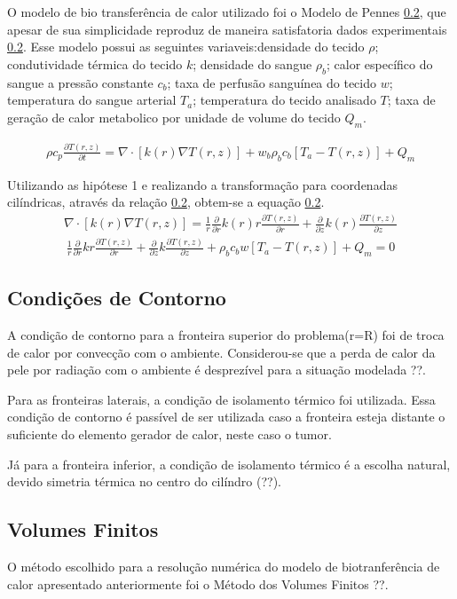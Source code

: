\documentclass[
	12pt,				%
	openright,			%
	oneside,			%
	a4paper,			%
	english,			%
	french,				%
	spanish,			%
	brazil				%
	]{abntex2}
\begin{document}
O modelo de bio transferência de calor utilizado foi o Modelo de Pennes \ref{}, que apesar de sua simplicidade reproduz de maneira satisfatoria dados experimentais \ref{}. Esse modelo possui as seguintes variaveis:densidade do tecido $\rho$; condutividade térmica do tecido $k$; densidade do sangue $\rho_b$; calor específico do sangue a pressão constante $c_b$; taxa de perfusão sanguínea do tecido $w$; temperatura do sangue arterial $T_a$; temperatura do tecido analisado $T$; taxa de geração de calor metabolico por unidade de volume do tecido $Q_m$.

\begin{gather}
\rho c_p \frac{\partial T(r,z)}{\partial t} = \nabla \cdot [k(r) \nabla T(r,z)] + w_b \rho_b c_b[T_a-T(r,z)]+Q_m
\end{gather}

Utilizando as hipótese 1 e realizando a transformação para coordenadas cilíndricas, através da relação \ref{}, obtem-se a equação \ref{}.
\begin{gather}
\nabla \cdot [k(r) \nabla T(r,z)] =\frac{1}{r}\frac{\partial}{\partial r}k(r) r \frac{\partial T(r,z)}{\partial r}+\frac{\partial}{\partial z}k(r)\frac{\partial T(r,z)}{\partial z}
\end{gather}
\begin{gather}
\frac{1}{r}\frac{\partial}{\partial r}k r \frac{\partial T(r,z)}{\partial r}+\frac{\partial}{\partial z}k\frac{\partial T(r,z)}{\partial z} +\rho_b c_b w [T_a-T(r,z)] +Q_m=0 
\end{gather}

\subsection{Condições de Contorno}
A condição de contorno para a fronteira superior do problema(r=R) foi de troca de calor por convecção com o ambiente. Considerou-se que a perda de calor da pele por radiação com o ambiente é desprezível para a situação modelada ??. 

Para as fronteiras laterais, a condição de isolamento térmico foi utilizada. Essa condição de contorno é passível de ser utilizada caso a fronteira esteja distante o suficiente do elemento gerador de calor, neste caso o tumor.

Já para a fronteira inferior, a condição de isolamento térmico é a escolha natural, devido simetria térmica no centro do cilíndro (??).

\subsection{Volumes Finitos}
O método escolhido para a resolução numérica do modelo de biotranferência de calor
apresentado anteriormente foi o Método dos Volumes Finitos ??.
\end{document}
